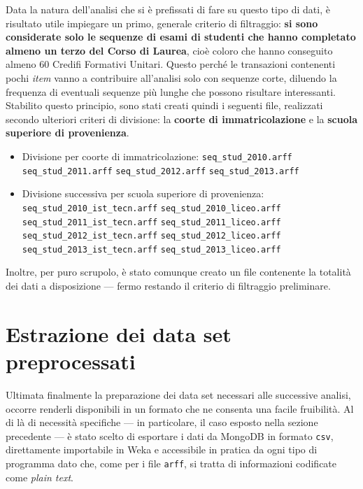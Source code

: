 	Data la natura dell'analisi che si è prefissati di fare su questo tipo di dati, è risultato utile impiegare un primo, generale criterio di filtraggio: \textbf{si sono considerate solo le sequenze di esami di studenti che hanno completato almeno un terzo del Corso di Laurea}, cioè coloro che hanno conseguito almeno 60 Credifi Formativi Unitari. Questo perché le transazioni contenenti pochi \textit{item} vanno a contribuire all'analisi solo con sequenze corte, diluendo la frequenza di eventuali sequenze più lunghe che possono risultare interessanti. \\

	Stabilito questo principio, sono stati creati quindi i seguenti file, realizzati secondo ulteriori criteri di divisione: la \textbf{coorte di immatricolazione} e la \textbf{scuola superiore di provenienza}.

	\begin{itemize}
		\item Divisione per coorte di immatricolazione:
		\subitem \texttt{seq\_stud\_2010.arff}
		\subitem \texttt{seq\_stud\_2011.arff}
		\subitem \texttt{seq\_stud\_2012.arff}
		\subitem \texttt{seq\_stud\_2013.arff}
		\item Divisione successiva per scuola superiore di provenienza:
		\subitem \texttt{seq\_stud\_2010\_ist\_tecn.arff}
		\subitem \texttt{seq\_stud\_2010\_liceo.arff}
		\subitem \texttt{seq\_stud\_2011\_ist\_tecn.arff}
		\subitem \texttt{seq\_stud\_2011\_liceo.arff}
		\subitem \texttt{seq\_stud\_2012\_ist\_tecn.arff}
		\subitem \texttt{seq\_stud\_2012\_liceo.arff}
		\subitem \texttt{seq\_stud\_2013\_ist\_tecn.arff}
		\subitem \texttt{seq\_stud\_2013\_liceo.arff}
	\end{itemize}

	Inoltre, per puro scrupolo, è stato comunque creato un file contenente la totalità dei dati a disposizione --- fermo restando il criterio di filtraggio preliminare.

\section{Estrazione dei data set preprocessati}

	Ultimata finalmente la preparazione dei data set necessari alle successive analisi, occorre renderli disponibili in un formato che ne consenta una facile fruibilità. Al di là di necessità specifiche --- in particolare, il caso esposto nella sezione precedente ---  è stato scelto di esportare i dati da MongoDB in formato \texttt{csv}, direttamente importabile in Weka e accessibile in pratica da ogni tipo di programma dato che, come per i file \texttt{arff}, si tratta di informazioni codificate come \textit{plain text}. \\ 
	
